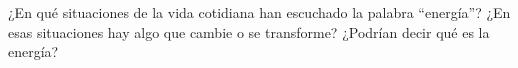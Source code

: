 ¿En qué situaciones de la vida cotidiana han escuchado la palabra “energía”? ¿En esas
situaciones hay algo que cambie o se transforme? ¿Podrían decir qué es la energía?


\begin{solutionbox}{2cm}
\end{solutionbox}
